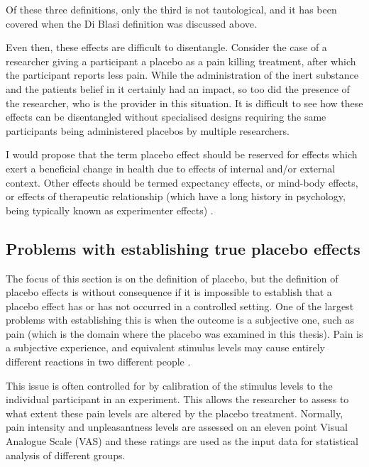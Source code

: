 Of these three definitions, only the third is not tautological, and it has been covered when the Di Blasi definition was discussed above. 

Even then, these effects are difficult to disentangle. Consider the case of a researcher giving a participant a placebo as a pain killing treatment, after which the participant reports less pain. While the administration of the inert substance and the patients belief in it certainly had an impact, so too did the presence of the researcher, who is the provider in this situation. It is difficult to see how these effects can be disentangled without specialised designs requiring the same participants being administered placebos by multiple researchers.   



I would propose that the term placebo effect should be reserved for effects which exert a beneficial change in health due to effects of internal and/or external context. Other effects should be termed expectancy effects, or mind-body effects, or effects of therapeutic relationship (which have a long history in psychology, being typically known as experimenter effects) \cite{rosenthal1969interpersonal,rosenthal1967covert,Rosenthal1956}.  

\subsection{Problems with establishing true placebo effects}

The focus of this section is on the definition of placebo, but the definition of placebo effects is without consequence if it is impossible to establish that a placebo effect has or has not occurred in a controlled setting. One of the largest problems with establishing this is when the outcome is a subjective one, such as pain (which is the domain where the placebo was examined in this thesis). Pain is a subjective experience, and equivalent stimulus levels may cause entirely different reactions  in two different people \cite{Kirsch1997}. 

This issue is often controlled for by calibration of the stimulus levels to the individual participant in an experiment. This allows the researcher to assess to what extent these pain levels are altered by the placebo treatment. Normally, pain intensity and unpleasantness levels are assessed on an eleven point Visual Analogue Scale (VAS)  and these ratings are used as the input data for statistical analysis of different groups. 

